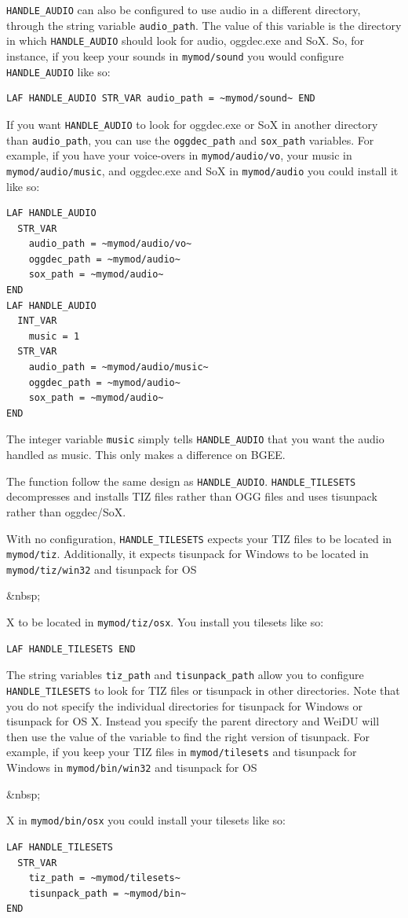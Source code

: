 \documentclass{article}
\def\ttref#1{\ahrefloc{#1}{\tt #1}}
\begin{document}
\verb+HANDLE_AUDIO+ can also be configured to use audio in a different
directory, through the string variable \verb+audio_path+. The value of
this variable is the directory in which \verb+HANDLE_AUDIO+ should
look for audio, oggdec.exe and SoX. So, for instance, if you keep your
sounds in \verb+mymod/sound+ you would configure \verb+HANDLE_AUDIO+
like so:
\begin{verbatim}
LAF HANDLE_AUDIO STR_VAR audio_path = ~mymod/sound~ END
\end{verbatim}
If you want \verb+HANDLE_AUDIO+ to look for oggdec.exe or SoX in
another directory than \verb+audio_path+, you can use the
\verb+oggdec_path+ and \verb+sox_path+ variables.  For example, if you
have your voice-overs in \verb+mymod/audio/vo+, your music in
\verb+mymod/audio/music+, and oggdec.exe and SoX in \verb+mymod/audio+
you could install it like so:
\begin{verbatim}
LAF HANDLE_AUDIO
  STR_VAR
    audio_path = ~mymod/audio/vo~
    oggdec_path = ~mymod/audio~
    sox_path = ~mymod/audio~
END
LAF HANDLE_AUDIO
  INT_VAR
    music = 1
  STR_VAR
    audio_path = ~mymod/audio/music~
    oggdec_path = ~mymod/audio~
    sox_path = ~mymod/audio~
END
\end{verbatim}
The integer variable \verb+music+ simply tells \verb+HANDLE_AUDIO+
that you want the audio handled as music. This only makes a difference
on BGEE.

The function \ttref{HANDLE_TILESETS} follow the same design as
\verb+HANDLE_AUDIO+. \verb+HANDLE_TILESETS+ decompresses and installs
TIZ files rather than OGG files and uses tisunpack rather than
oggdec/SoX.

With no configuration, \verb+HANDLE_TILESETS+ expects your TIZ files
to be located in \verb+mymod/tiz+. Additionally, it expects tisunpack
for Windows to be located in \verb+mymod/tiz/win32+ and tisunpack for
OS\begin{rawhtml}&nbsp;\end{rawhtml}X to be located in
\verb+mymod/tiz/osx+. You install you tilesets like so:
\begin{verbatim}
LAF HANDLE_TILESETS END
\end{verbatim}
The string variables \verb+tiz_path+ and \verb+tisunpack_path+ allow
you to configure \verb+HANDLE_TILESETS+ to look for TIZ files or
tisunpack in other directories. Note that you do not specify the
individual directories for tisunpack for Windows or tisunpack for OS
X. Instead you specify the parent directory and WeiDU will then use
the value of the variable \ttref{WEIDU_OS} to find the right version
of tisunpack. For example, if you keep your TIZ files in
\verb+mymod/tilesets+ and tisunpack for Windows in
\verb+mymod/bin/win32+ and tisunpack for
OS\begin{rawhtml}&nbsp;\end{rawhtml}X in \verb+mymod/bin/osx+ you
could install your tilesets like so:
\begin{verbatim}
LAF HANDLE_TILESETS
  STR_VAR
    tiz_path = ~mymod/tilesets~
    tisunpack_path = ~mymod/bin~
END
\end{verbatim}
\end{document}
